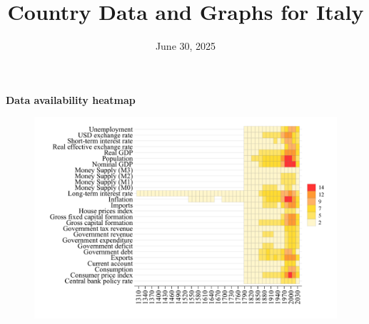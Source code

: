 \documentclass[12pt,a4paper,landscape]{article}
\begin{document}
\title{\Large Country Data and Graphs for Italy}
\date{June 30, 2025}
\maketitle
\thispagestyle{empty}

\clearpage
\setcounter{page}{1}
\hypersetup{colorlinks=true,linkcolor=blue,linktoc=all}
\label{toc}
\tableofcontents
\thispagestyle{empty}
\clearpage
{}
{}
\begin{center}
{\Large\bfseries Data availability heatmap}
\end{center}
\vspace{1cm}
\begin{figure}[H]
\centering
\includegraphics[width=\textwidth,height=0.8\textheight,keepaspectratio]{graphs/ITA_heatmap.pdf}
\end{figure}
\setcounter{page}{3}
\end{document}
